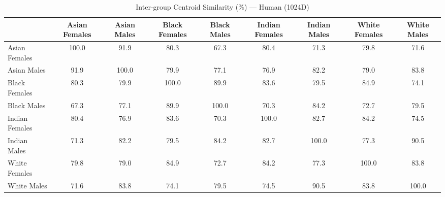 \begin{table}[htbp]
\centering
\caption{Inter-group Centroid Similarity (\%) — Human (1024D)}
\label{tab:inter-vladmandic-human}
\tiny
\begin{tabular}{lcccccccc}
\toprule
 & Asian Females & Asian Males & Black Females & Black Males & Indian Females & Indian Males & White Females & White Males \\
\midrule
Asian Females & 100.0 & 91.9 & 80.3 & 67.3 & 80.4 & 71.3 & 79.8 & 71.6 \\
Asian Males & 91.9 & 100.0 & 79.9 & 77.1 & 76.9 & 82.2 & 79.0 & 83.8 \\
Black Females & 80.3 & 79.9 & 100.0 & 89.9 & 83.6 & 79.5 & 84.9 & 74.1 \\
Black Males & 67.3 & 77.1 & 89.9 & 100.0 & 70.3 & 84.2 & 72.7 & 79.5 \\
Indian Females & 80.4 & 76.9 & 83.6 & 70.3 & 100.0 & 82.7 & 84.2 & 74.5 \\
Indian Males & 71.3 & 82.2 & 79.5 & 84.2 & 82.7 & 100.0 & 77.3 & 90.5 \\
White Females & 79.8 & 79.0 & 84.9 & 72.7 & 84.2 & 77.3 & 100.0 & 83.8 \\
White Males & 71.6 & 83.8 & 74.1 & 79.5 & 74.5 & 90.5 & 83.8 & 100.0 \\
\bottomrule
\end{tabular}
\end{table}
